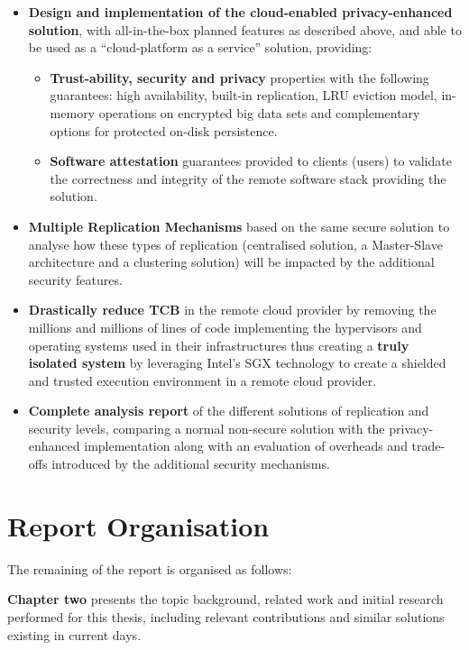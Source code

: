 \begin{itemize}
  \item \textbf{Design and implementation of the cloud-enabled privacy-enhanced solution}, with all-in-the-box planned features as described above, and able to be used as a “cloud-platform as a service” solution, providing:
 	\begin{itemize}
 		\item \textbf{Trust-ability, security and privacy} properties with the following guarantees: high availability, built-in replication, LRU eviction model, in-memory operations on encrypted big data sets and complementary options for protected on-disk persistence.
 		\item \textbf{Software attestation} guarantees provided to clients (users) to validate the correctness and integrity of the remote software stack providing the solution.
 	\end{itemize}
  \item \textbf{Multiple Replication Mechanisms} based on the same secure solution to analyse how these types of replication (centralised solution, a Master-Slave architecture and a clustering solution) will be impacted by the additional security features.
  \item \textbf{Drastically reduce TCB} in the remote cloud provider by removing the millions and millions of lines of code implementing the hypervisors and operating systems used in their infrastructures thus creating a \textbf{truly isolated system} by leveraging Intel's \gls{SGX} technology to create a shielded and trusted execution environment in a remote cloud provider.
  \item \textbf{Complete analysis report} of the different solutions of replication and security levels, comparing a normal non-secure solution with the privacy-enhanced implementation along with an evaluation of overheads and trade-offs introduced by the additional security mechanisms.
\end{itemize}

\section{Report Organisation}
\label{sec:report_organisation}

The remaining of the report is organised as follows:

\textbf{Chapter two} presents the topic background, related work and initial research performed for this thesis, including relevant contributions and similar solutions existing in current days.

